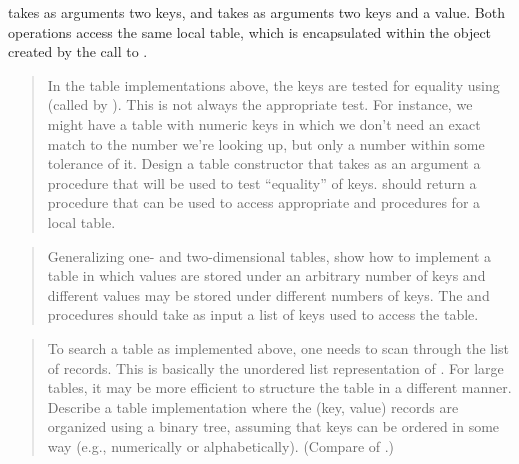 \noindent
{} takes as arguments two keys, and  takes as arguments two
keys and a value.  Both operations access the same local table, which is
encapsulated within the object created by the call to .

\begin{quote}
 In the table implementations
above, the keys are tested for equality using  (called by
).  This is not always the appropriate test.  For instance, we
might have a table with numeric keys in which we don't need an exact match to
the number we're looking up, but only a number within some tolerance of it.
Design a table constructor  that takes as an argument a
 procedure that will be used to test ``equality'' of keys.
 should return a  procedure that can be used to
access appropriate  and  procedures for a local
table.
\end{quote}

\begin{quote}
 Generalizing one- and
two-dimensional tables, show how to implement a table in which values are
stored under an arbitrary number of keys and different values may be stored
under different numbers of keys.  The  and 
procedures should take as input a list of keys used to access the table.
\end{quote}

\begin{quote}
 To search a table as implemented
above, one needs to scan through the list of records.  This is basically the
unordered list representation of .  For large tables, it may
be more efficient to structure the table in a different manner.  Describe a
table implementation where the (key, value) records are organized using a
binary tree, assuming that keys can be ordered in some way (e.g., numerically
or alphabetically).  (Compare  of .)
\end{quote}

